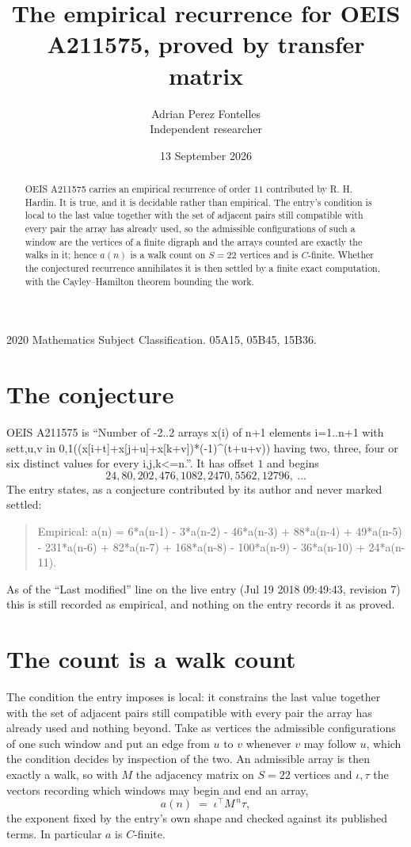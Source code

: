 \documentclass[11pt,a4paper]{article}
\title{The empirical recurrence for OEIS A211575, proved by transfer matrix}
\author{Adrian Perez Fontelles\\ \small Independent researcher}
\date{13 September 2026}
\theoremstyle{plain}
\theoremstyle{definition}
\begin{document}
\maketitle

\begin{abstract}
OEIS A211575 carries an empirical recurrence of order $11$ contributed by R. H. Hardin. It is
true, and it is decidable rather than empirical. The entry's condition is local to the last value together with the set of adjacent pairs still compatible with every pair the array has already used, so
the admissible configurations of such a window are the vertices of a finite digraph and the
arrays counted are exactly the walks in it; hence $a(n)$ is a walk count on $S=22$ vertices
and is $C$-finite. Whether the conjectured recurrence annihilates it is then settled by a
finite exact computation, with the Cayley--Hamilton theorem bounding the work.
\end{abstract}

\noindent\small 2020 Mathematics Subject Classification. 05A15, 05B45, 15B36.\normalsize

\section{The conjecture}

OEIS A211575 is ``Number of -2..2 arrays x(i) of n+1 elements i=1..n+1 with set{t,u,v in 0,1}((x[i+t]+x[j+u]+x[k+v])*(-1)\^{}(t+u+v)) having two, three, four or six distinct values for every i,j,k<=n.''. It has offset $1$ and begins
\[
24, 80, 202, 476, 1082, 2470, 5562, 12796,\ \dots
\]
The entry states, as a conjecture contributed by its author and never marked settled:
\begin{quote}
Empirical: a(n) = 6*a(n-1) - 3*a(n-2) - 46*a(n-3) + 88*a(n-4) + 49*a(n-5) - 231*a(n-6) + 82*a(n-7) + 168*a(n-8) - 100*a(n-9) - 36*a(n-10) + 24*a(n-11).
\end{quote}
As of the ``Last modified'' line on the live entry (Jul 19 2018 09:49:43, revision 7) this is still
recorded as empirical, and nothing on the entry records it as proved.

\section{The count is a walk count}

The condition the entry imposes is local: it constrains the last value together with the set of adjacent pairs still compatible with every pair the array has already used and nothing beyond. Take as
vertices the admissible configurations of one such window and put an edge from $u$ to $v$
whenever $v$ may follow $u$, which the condition decides by inspection of the two. An
admissible array is then exactly a walk, so with $M$ the adjacency matrix on $S=22$ vertices
and $\iota,\tau$ the vectors recording which windows may begin and end an array,
\[
a(n)\;=\;\iota^{\!\top}M^{\,n}\tau ,
\]
the exponent fixed by the entry's own shape and checked against its published terms. In
particular $a$ is $C$-finite.
\end{document}
